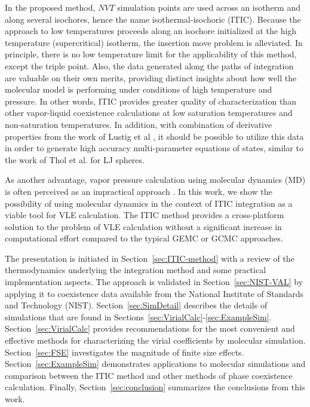 \documentclass[5p,times]{elsarticle}
\begin{document}
In the proposed method, $NVT$ simulation points are used across an isotherm and along several isochores, hence the name isothermal-isochoric (ITIC). Because the approach to low temperatures proceeds along an isochore initialized at the high temperature (supercritical) isotherm, the insertion move problem is alleviated. In principle, there is no low temperature limit for the applicability of this method, except the triple point. Also, the data generated along the paths of integration are valuable on their own merits, providing distinct insights about how well the molecular model is performing under conditions of high temperature and pressure. In other words, ITIC provides greater quality of characterization than other vapor-liquid coexistence calculations at low saturation temperatures and non-saturation temperatures. In addition, with combination of derivative properties from the work of Lustig et al \cite{Lustig2015}, it should be possible to utilize this data in order to generate high accuracy multi-parameter equations of states, similar to the work of Thol et al. \cite{Thol2015b} for LJ spheres.

As another advantage, vapor pressure calculation using molecular dynamics (MD) is often perceived as an impractical approach \cite{Nieto-Draghi2015}. In this work, we show the possibility of using molecular dynamics in the context of ITIC integration as a viable tool for VLE calculation. The ITIC method provides a cross-platform solution to the problem of VLE calculation without a significant increase in computational effort compared to the typical GEMC or GCMC approaches.
 
The presentation is initiated in Section~\ref{sec:ITIC-method} with a review of the thermodynamics underlying the integration method and some practical implementation aspects. The approach is validated in Section~\ref{sec:NIST-VAL} by applying it to coexistence data available from the National Institute of Standards and Technology (NIST). Section~\ref{sec:SimDetail} describes the details of simulations that are found in Sections~\ref{sec:VirialCalc}-\ref{sec:ExampleSim}. Section~\ref{sec:VirialCalc} provides recommendations for the most convenient and effective methods for characterizing the virial coefficients by molecular simulation. Section~\ref{sec:FSE} investigates the magnitude of finite size effects. Section~\ref{sec:ExampleSim} demonstrates applications to molecular simulations and comparison between the ITIC method and other methods of phase coexistence calculation. Finally, Section~\ref{sec:conclusion} summarizes the conclusions from this work.
\end{document}
